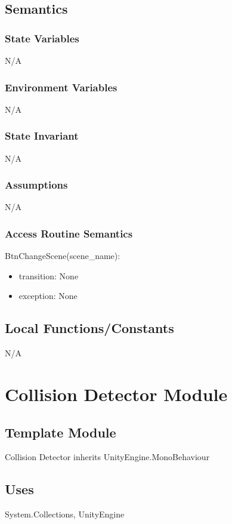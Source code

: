 \documentclass[12pt]{article}
\begin{document}
\subsection {Semantics}

\subsubsection {State Variables}
N/A

\subsubsection {Environment Variables}
N/A

\subsubsection {State Invariant}
N/A
\subsubsection {Assumptions}
N/A
\subsubsection {Access Routine Semantics}

\noindent BtnChangeScene(scene\_name):
\begin{itemize}
	\item transition: None
	\item exception: None
\end{itemize}

\subsection{Local Functions/Constants}
N/A

\newpage
\section{Collision Detector Module}

\subsection{Template Module}
Collision Detector inherits  UnityEngine.MonoBehaviour

\subsection {Uses}
System.Collections, UnityEngine
\end{document}
